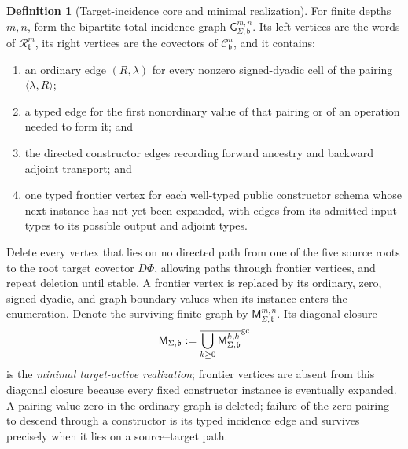 \documentclass[11pt]{article}
\numberwithin{section}{part}
\theoremstyle{plain}
\theoremstyle{definition}
\newtheorem{definition}[definition]{Definition}
\theoremstyle{remark}
\begin{document}
\begin{definition}[Target-incidence core and minimal realization]
\label{def:target-incidence-minimal-realization}
For finite depths \(m,n\), form the bipartite total-incidence graph
\(\mathsf G^{m,n}_{\Sigma,\mathfrak b}\).  Its left vertices are the words of
\(\mathscr R^m_{\mathfrak b}\), its right vertices are the covectors of
\(\mathscr C^n_{\mathfrak b}\), and it contains:
\begin{enumerate}[label=\textup{(I\arabic*)}]
\item an ordinary edge \((R,\lambda)\) for every nonzero signed-dyadic cell
of the pairing \(\langle\lambda,R\rangle\);
\item a typed edge for the first nonordinary value of that pairing or of an
operation needed to form it; and
\item the directed constructor edges recording forward ancestry and backward
adjoint transport; and
\item one typed frontier vertex for each well-typed public constructor schema
whose next instance has not yet been expanded, with edges from its admitted
input types to its possible output and adjoint types.
\end{enumerate}
Delete every vertex that lies on no directed path from one of the five source
roots to the root target covector \(D\Phi\), allowing paths through frontier
vertices, and repeat deletion until stable.  A frontier vertex is replaced by
its ordinary, zero, signed-dyadic, and graph-boundary values when its instance
enters the enumeration.
Denote the surviving finite graph by
\(\mathsf M^{m,n}_{\Sigma,\mathfrak b}\).  Its diagonal closure
\begin{equation}
 \label{eq:minimal-target-active-realization}
 \mathsf M_{\Sigma,\mathfrak b}
 :=\overline{\bigcup_{k\ge0}
       \mathsf M^{k,k}_{\Sigma,\mathfrak b}}^{\rm gc}
\end{equation}
is the \emph{minimal target-active realization}; frontier vertices are absent
from this diagonal closure because every fixed constructor instance is
eventually expanded.  A pairing value zero in the
ordinary graph is deleted; failure of the zero pairing to descend through a
constructor is its typed incidence edge and survives precisely when it lies
on a source--target path.
\end{definition}
\end{document}
